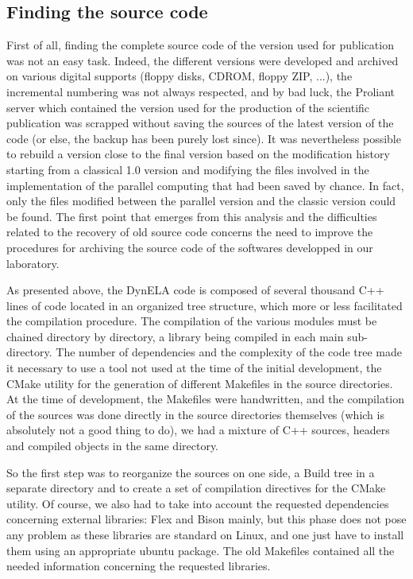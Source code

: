 \subsection{Finding the source code}

First of all, finding the complete source code of the version used for publication was not an easy task. Indeed, the different versions were developed and archived on various digital supports (floppy disks, CDROM, floppy ZIP, ...), the incremental numbering was not always respected, and by bad luck, the Proliant server which contained the version used for the production of the scientific publication was scrapped without saving the sources of the latest version of the code (or else, the backup has been purely lost since). It was nevertheless possible to rebuild a version close to the final version based on the modification history starting from a classical 1.0 version and modifying the files involved in the implementation of the parallel computing that had been saved by chance. In fact, only the files modified between the parallel version and the classic version could be found. The first point that emerges from this analysis and the difficulties related to the recovery of old source code concerns the need to improve the procedures for archiving the source code of the softwares developped in our laboratory.

As presented above, the DynELA code is composed of several thousand C++ lines of code located in an organized tree structure, which more or less facilitated the compilation procedure. The compilation of the various modules must be chained directory by directory, a library being compiled in each main sub-directory. The number of dependencies and the complexity of the code tree made it necessary to use a tool not used at the time of the initial development, the CMake \cite{CMake} utility for the generation of different Makefiles in the source directories. At the time of development, the Makefiles were handwritten, and the compilation of the sources was done directly in the source directories themselves (which is absolutely not a good thing to do), we had a mixture of C++ sources, headers and compiled objects in the same directory.

So the first step was to reorganize the sources on one side, a Build tree in a separate directory and to create a set of compilation directives for the CMake utility. Of course, we also had to take into account the requested dependencies concerning external libraries: Flex and Bison \cite{Levine:2009} mainly, but this phase does not pose any problem as these libraries are standard on Linux, and one just have to install them using an appropriate ubuntu package. The old Makefiles contained all the needed information concerning the requested libraries.

